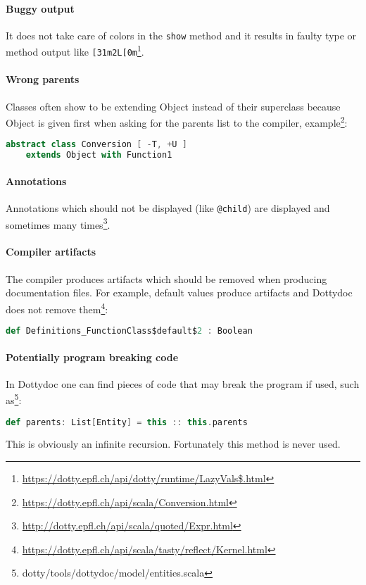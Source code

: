 \documentclass{report}
\begin{document}
\paragraph{Buggy output}
It does not take care of colors in the \texttt{show} method and it results in faulty type or method output like \texttt{[31m2L[0m}\footnote{\url{https://dotty.epfl.ch/api/dotty/runtime/LazyVals$.html}}.

\paragraph{Wrong parents}
Classes often show to be extending Object instead of their superclass because Object is given first when asking for the parents list to the compiler, example\footnote{\url{https://dotty.epfl.ch/api/scala/Conversion.html}}:
\begin{lstlisting}[language=scala]
    abstract class Conversion [ -T, +U ]
    extends Object with Function1
\end{lstlisting}

\paragraph{Annotations}
Annotations which should not be displayed (like \texttt{@child}) are displayed and sometimes many times\footnote{\url{http://dotty.epfl.ch/api/scala/quoted/Expr.html}}.

\paragraph{Compiler artifacts}
The compiler produces artifacts which should be removed when producing documentation files. For example, default values produce artifacts and Dottydoc does not remove them\footnote{\url{https://dotty.epfl.ch/api/scala/tasty/reflect/Kernel.html}}:
\begin{lstlisting}[language=scala]
    def Definitions_FunctionClass$default$2 : Boolean
\end{lstlisting}

\paragraph{Potentially program breaking code}
In Dottydoc one can find pieces of code that may break the program if used, such as\footnote{dotty/tools/dottydoc/model/entities.scala}:
\begin{lstlisting}[language=scala]
    def parents: List[Entity] = this :: this.parents
\end{lstlisting}
This is obviously an infinite recursion. Fortunately this method is never used.
\end{document}
